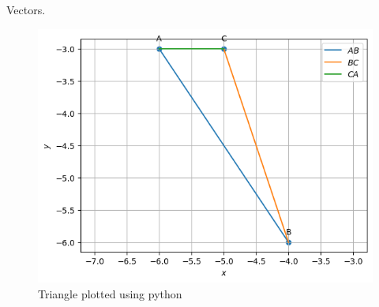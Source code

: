\begin{table}[H]
        \caption{Vectors.}
        \centering
        
    \end{table}
\begin{figure}[H]
\includegraphics[width=\columnwidth]{1.1/figs/1.1.png}
\caption{Triangle plotted using python}
\label{fig:i_1.1_py}
\end{figure}
